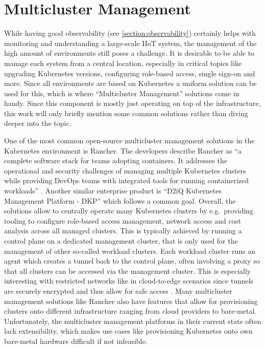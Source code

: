 \section{Multicluster Management}
\label{section:multicluster-mgmt}

    While having good observability (see \autoref{section:observability}) certainly helps with monitoring and understanding a large-scale IIoT system, the management of the high amount of environments still poses a challenge. It is desirable to be able to manage each system from a central location, especially in critical topics like upgrading Kubernetes versions, configuring role-based access, single sign-on and more. Since all environments are based on Kubernetes a uniform solution can be used for this, which is where ``Multicluster Management'' solutions come in handy. Since this component is mostly just operating on top of the infrastructure, this work will only briefly mention some common solutions rather than diving deeper into the topic.\newline

    One of the most common open-source multicluster management solutions in the Kubernetes environment is Rancher. The developers describe Rancher as ``a complete software stack for teams adopting containers. It addresses the operational and security challenges of managing multiple Kubernetes clusters while providing DevOps teams with integrated tools for running containerized workloads'' \cite{rancher_platform}. Another similar enterprise product is ``D2iQ Kubernetes Management Platform - DKP'' which follows a common goal. Overall, the solutions allow to centrally operate many Kubernetes clusters by e.g.\ providing tooling to configure role-based access management, network access and cost analysis across all managed clusters. This is typically achieved by running a control plane on a dedicated management cluster, that is only used for the management of other so-called workload clusters. Each workload cluster runs an agent which creates a tunnel back to the control plane, often involving a proxy so that all clusters can be accessed via the management cluster. This is especially interesting with restricted networks like in cloud-to-edge scenarios since tunnels are securely encrypted and thus allow for safe access \cite{building_iiot}. Many multicluster management solutions like Rancher also have features that allow for provisioning clusters onto different infrastructure ranging from cloud providers to bare-metal. Unfortunately, the multicluster management platforms in their current state often lack extensibility, which makes use cases like provisioning Kubernetes onto own bare-metal hardware difficult if not infeasible.

